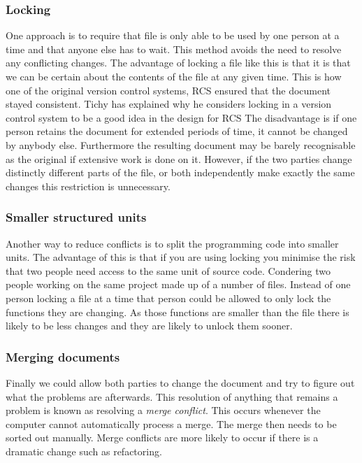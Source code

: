 \subsubsection{Locking}
One approach is to require that file is only able to be used by one person at a time and that anyone else has to wait. This method avoids the need to resolve any conflicting changes.  The advantage of locking a file like this is that it is that we can be certain about the contents of the file at any given time. This is how one of the original version control systems, RCS ensured that the document stayed consistent. Tichy has explained why he considers locking in a version control system to be a good idea in the design for RCS\cite{Tichy1982} The disadvantage is if one person retains the document for extended periods of time, it cannot be changed by anybody else. Furthermore the resulting document may be barely recognisable as the original if extensive work is done on it. However, if the two parties change distinctly different parts of the file, or both independently make exactly the same changes this restriction is unnecessary. 
\subsubsection{Smaller structured units}
Another way to reduce conflicts is to split the programming code into smaller units.  The advantage of this is that if you are using locking you minimise the risk that two people need access to the same unit of source code. Condering two people working on the same project made up of a number of files.  Instead of one person locking a file at a time that person could be allowed to only lock the functions they are changing. As those functions are smaller than the file there is likely to be less changes and they are likely to unlock them sooner.
\subsubsection{Merging documents}
Finally we could allow both parties to change the document and try to figure out what the problems are afterwards.  This resolution of anything that remains a problem is known as resolving a \emph{merge conflict}. This occurs whenever the computer cannot automatically process a merge.  The merge then needs to be sorted out manually. Merge conflicts are more likely to occur if there is a dramatic change such as refactoring.

